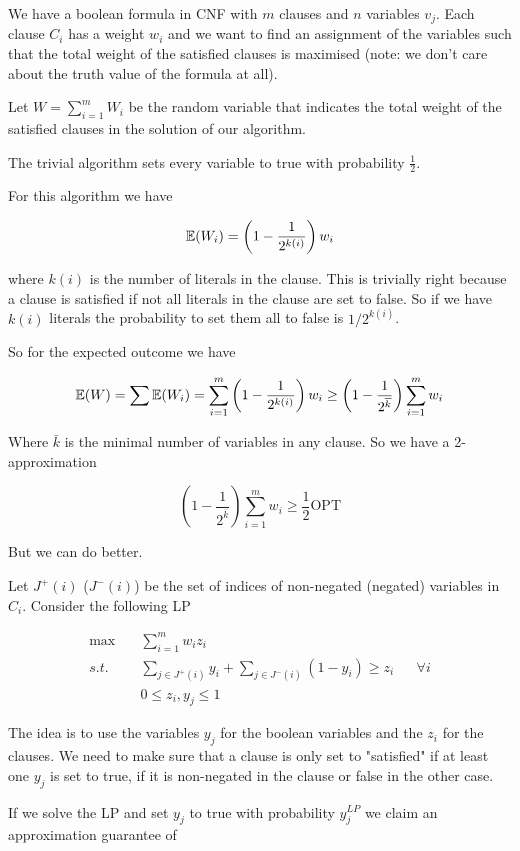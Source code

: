 \begin{Ex} We have a boolean formula in CNF with $m$ clauses and $n$ variables $v_j$. Each clause $C_i$ has a weight $w_i$ and we want to find an assignment of the variables such that the total weight of the satisfied clauses is maximised (note: we don't care about the truth value of the formula at all).

Let $W= \sum_{i=1}^m W_i $ be the random variable that indicates the total weight of the satisfied clauses in the solution of our algorithm.

The trivial algorithm sets every variable to true with probability $\frac 12$.

For this algorithm we have

\[\mathbb{E}(W_i) = \left(1-\frac{1}{2^{k(i)}}\right)w_i\]

where $k(i)$ is the number of literals in the clause. This is trivially right because a clause is satisfied if not all literals in the clause are set to false. So if we have $k(i)$ literals the probability to set them all to false is $1/2^{k(i)}$.

So for the expected outcome we have

\[\mathbb{E}(W) = \sum \mathbb{E}(W_i) = \sum_{i=1}^m \left(1-\frac{1}{2^{k(i)}}\right) w_i \geq \left(1-\frac{1}{2^{\overline k}}\right) \sum_{i=1}^m w_i\]

Where $\bar k$ is the minimal number of variables in any clause. So we have a 2-approximation

\[\left(1-\frac{1}{2^{\bar k}}\right) \sum_{i=1}^m w_i \geq \frac 12 \text{OPT}\]

But we can do better. 

Let $J^+(i)$ ($J^-(i)$) be the set of indices of non-negated (negated) variables in $C_i$. Consider the following LP

\begin{align*}
\max \quad & \sum_{i=1}^m w_iz_i\\
s.t. \quad &\sum_{j\in J^+(i)} y_i + \sum_{j\in J^-(i)} (1-y_i) \geq z_i && \forall i\\
&0\leq z_i, y_j \leq 1
\end{align*}

The idea is to use the variables $y_j$ for the boolean variables and the $z_i$ for the clauses. We need to make sure that a clause is only set to "satisfied" if at least one $y_j$ is set to true, if it is non-negated in the clause or false in the other case.

If we solve the LP and set $y_j$ to true with probability $y_j^{LP}$ we claim an approximation guarantee of 


\end{Ex}
